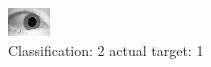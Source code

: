 \begin{figure}[h!]
\begin{center}
\includegraphics[width=0.60\columnwidth]{figures/ID1575_class_2_target_1.png}
\end{center}
\caption{ Classification: 2 actual target: 1}
\label{fig:ID1575_class_2_target_1}
\end{figure}
